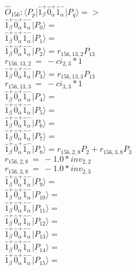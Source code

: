 \documentclass[14pt]{article}
\begin{document}
    $\hat{O}_{156}:  \langle{P_p}\vert \hat{1}_{\beta}^{+}\hat{0}_{\alpha}^{+}\hat{1}_{\alpha}^{-} \vert{P_q}\rangle => $ \\ 
    $ \hat{1}_{\beta}^{+}\hat{0}_{\alpha}^{+}\hat{1}_{\alpha}^{-} \vert{P_{0}}\rangle =  $ \\ 
    $ \hat{1}_{\beta}^{+}\hat{0}_{\alpha}^{+}\hat{1}_{\alpha}^{-} \vert{P_{1}}\rangle =  $ \\ 
    $ \hat{1}_{\beta}^{+}\hat{0}_{\alpha}^{+}\hat{1}_{\alpha}^{-} \vert{P_{2}}\rangle = {r}_{156,13,2}P_{13} $ \\ 
    ${r}_{156,13,2}\ =\ -{ci}_{2,3}*1 $ \\ 
    $ \hat{1}_{\beta}^{+}\hat{0}_{\alpha}^{+}\hat{1}_{\alpha}^{-} \vert{P_{3}}\rangle = {r}_{156,13,3}P_{13} $ \\ 
    ${r}_{156,13,3}\ =\ -{ci}_{3,3}*1 $ \\ 
    $ \hat{1}_{\beta}^{+}\hat{0}_{\alpha}^{+}\hat{1}_{\alpha}^{-} \vert{P_{4}}\rangle =  $ \\ 
    $ \hat{1}_{\beta}^{+}\hat{0}_{\alpha}^{+}\hat{1}_{\alpha}^{-} \vert{P_{5}}\rangle =  $ \\ 
    $ \hat{1}_{\beta}^{+}\hat{0}_{\alpha}^{+}\hat{1}_{\alpha}^{-} \vert{P_{6}}\rangle =  $ \\ 
    $ \hat{1}_{\beta}^{+}\hat{0}_{\alpha}^{+}\hat{1}_{\alpha}^{-} \vert{P_{7}}\rangle =  $ \\ 
    $ \hat{1}_{\beta}^{+}\hat{0}_{\alpha}^{+}\hat{1}_{\alpha}^{-} \vert{P_{8}}\rangle = {r}_{156,2,8}P_{2}+{r}_{156,3,8}P_{3} $ \\ 
    ${r}_{156,2,8}\ =\ -1.0*{inv}_{2,2} $ \\ 
    ${r}_{156,3,8}\ =\ -1.0*{inv}_{2,3} $ \\ 
    $ \hat{1}_{\beta}^{+}\hat{0}_{\alpha}^{+}\hat{1}_{\alpha}^{-} \vert{P_{9}}\rangle =  $ \\ 
    $ \hat{1}_{\beta}^{+}\hat{0}_{\alpha}^{+}\hat{1}_{\alpha}^{-} \vert{P_{10}}\rangle =  $ \\ 
    $ \hat{1}_{\beta}^{+}\hat{0}_{\alpha}^{+}\hat{1}_{\alpha}^{-} \vert{P_{11}}\rangle =  $ \\ 
    $ \hat{1}_{\beta}^{+}\hat{0}_{\alpha}^{+}\hat{1}_{\alpha}^{-} \vert{P_{12}}\rangle =  $ \\ 
    $ \hat{1}_{\beta}^{+}\hat{0}_{\alpha}^{+}\hat{1}_{\alpha}^{-} \vert{P_{13}}\rangle =  $ \\ 
    $ \hat{1}_{\beta}^{+}\hat{0}_{\alpha}^{+}\hat{1}_{\alpha}^{-} \vert{P_{14}}\rangle =  $ \\ 
    $ \hat{1}_{\beta}^{+}\hat{0}_{\alpha}^{+}\hat{1}_{\alpha}^{-} \vert{P_{15}}\rangle =  $ \\ 
    
\end{document}
